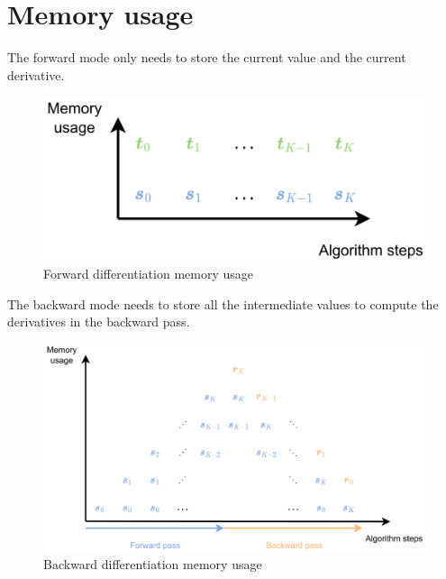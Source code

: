 \documentclass[12pt, openany]{report}
\theoremstyle{definition}
\begin{document}
\section{Memory usage}
The forward mode only needs to store the current value and the current derivative.\\
\begin{figure}[H]
    \centering
    \includegraphics[width=\textwidth]{img/fd_mem.png}
    \caption{Forward differentiation memory usage}
    \label{fig:fd_mem}
\end{figure}
The backward mode needs to store all the intermediate values to compute the derivatives in the backward pass.\\
\begin{figure}[H]
    \centering
    \includegraphics[width=\textwidth]{img/bd_mem.png}
    \caption{Backward differentiation memory usage}
    \label{fig:bd_mem}
\end{figure}
\end{document}

